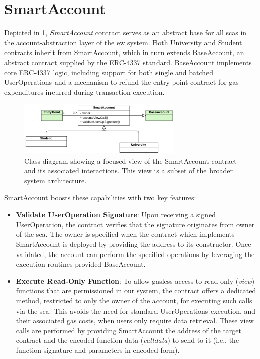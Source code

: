 \section{SmartAccount}
\label{sec:smartAccountDesign}
Depicted in \cref{fig:smartAccountContractClass}, \textit{SmartAccount} contract serves as an abstract base for all \acrlong{sca}s in the account-abstraction layer of the \acrlong{ew} system. Both University and Student contracts inherit from SmartAccount, which in turn extends BaseAccount, an abstract contract supplied by the ERC-4337 standard. BaseAccount implements core ERC-4337 logic, including support for both single and batched UserOperations and a mechanism to refund the entry point contract for gas expenditures incurred during transaction execution.

\begin{figure}
  \centering
  \includegraphics[width=0.7\textwidth]{figures/SmartAccount class diagram.pdf}
  \caption[Class diagram focused on SmartAccount contract]{Class diagram showing a focused view of the SmartAccount contract and its associated interactions. This view is a subset of the broader system architecture.}
  \label{fig:smartAccountContractClass}
\end{figure}

SmartAccount boosts these capabilities with two key features:
\begin{itemize}
    \item \textbf{Validate UserOperation Signature}: Upon receiving a signed UserOperation, the contract verifies that the signature originates from owner of the \acrshort{sca}. The owner is specified when the contract which implements SmartAccount is deployed by providing the address to its constructor. Once validated, the account can perform the specified operations by leveraging the execution routines provided BaseAccount.
    \item \textbf{Execute Read-Only Function}: To allow gasless access to read-only (\textit{view}) functions that are permissioned in our system, the contract offers a dedicated method, restricted to only the owner of the account, for executing such calls via the \acrshort{sca}. This avoids the need for standard UserOperations execution, and their associated gas costs, when users only require data retrieval. These view calls are performed by providing SmartAccount the address of the target contract and the encoded function data (\textit{calldata}) to send to it (i.e., the function signature and parameters in encoded form).
\end{itemize}

